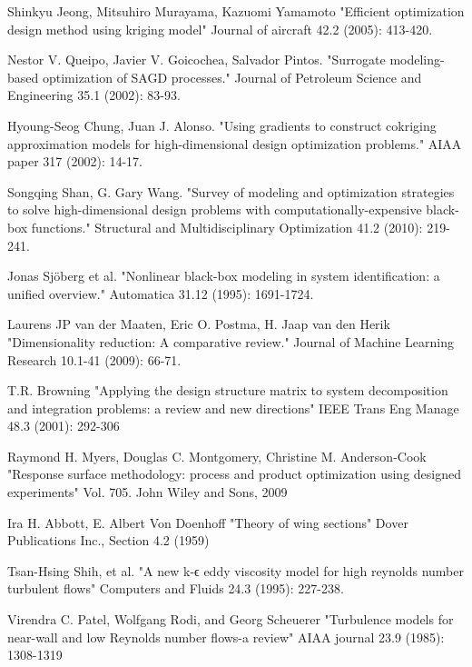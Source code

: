 \documentclass[a4paper,onecolumn]{article}
\theoremstyle{remark}
\begin{document}
\begin{thebibliography}{9}
Shinkyu Jeong, Mitsuhiro Murayama, Kazuomi Yamamoto
"Efficient optimization design method using kriging model" 
Journal of aircraft 42.2 (2005): 413-420.

Nestor V. Queipo, Javier V. Goicochea, Salvador Pintos. 
"Surrogate modeling-based optimization of SAGD processes." 
Journal of Petroleum Science and Engineering 35.1 (2002): 83-93.

Hyoung-Seog Chung, Juan J. Alonso. 
"Using gradients to construct cokriging approximation models for high-dimensional design optimization problems." 
AIAA paper 317 (2002): 14-17.

Songqing Shan, G. Gary Wang. 
"Survey of modeling and optimization strategies to solve high-dimensional design problems with computationally-expensive black-box functions." 
Structural and Multidisciplinary Optimization 41.2 (2010): 219-241.

Jonas Sjöberg et al.
"Nonlinear black-box modeling in system identification: a unified overview." 
Automatica 31.12 (1995): 1691-1724.

Laurens JP van der Maaten, Eric O. Postma, H. Jaap van den Herik
"Dimensionality reduction: A comparative review." 
Journal of Machine Learning Research 10.1-41 (2009): 66-71.

T.R. Browning
"Applying the design structure matrix to system decomposition and integration problems: a review
 and new directions"
IEEE Trans Eng Manage 48.3 (2001): 292-306

Raymond H. Myers, Douglas C. Montgomery, Christine M. Anderson-Cook
"Response surface methodology: process and product optimization using designed experiments"
Vol. 705. John Wiley and Sons, 2009

Ira H. Abbott, E. Albert Von Doenhoff
"Theory of wing sections"
Dover Publications Inc., Section 4.2 (1959)

Tsan-Hsing Shih, et al. 
"A new k-ϵ eddy viscosity model for high reynolds number turbulent flows" 
Computers and Fluids 24.3 (1995): 227-238.

Virendra C. Patel, Wolfgang Rodi, and Georg Scheuerer
"Turbulence models for near-wall and low Reynolds number flows-a review"
AIAA journal 23.9 (1985): 1308-1319


\end{thebibliography}
\end{document}
